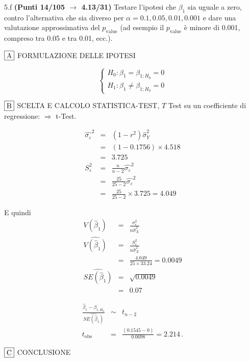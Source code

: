 \documentclass[
  11pt,
]{book}
\theoremstyle{mytheoremstyle}
\theoremstyle{mydefstyle}
\newenvironment{sol}
  {
  \begin{tcolorbox}[enhanced,breakable,arc=0.1mm,boxrule=1pt,colback=white,colframe=iblue,
  title=\bf \fontfamily{lmss}\selectfont \hspace{.5 cm} Soluzione,drop fuzzy shadow]

}{
\end{tcolorbox}
  }
\begin{document}
5.f \textbf{(Punti 14/105 \(\rightarrow\) 4.13/31)} Testare l'ipotesi che \(\beta_1\) sia uguale a zero, contro l'alternativa che sia diverso per \(\alpha=0.1,0.05,0.01,0.001\) e dare una valutazione approssimativa del \(p_\text{value}\) (ad esempio il \(p_\text{value}\) è minore di 0.001, compreso tra 0.05 e tra 0.01, ecc.).

\begin{sol}
\(\fbox{A}\) FORMULAZIONE DELLE IPOTESI

\[\begin{cases}
   H_0: \beta_1 = \beta_{1;H_0}=0 \\
   H_1: \beta_1 \neq \beta_{1;H_0}=0 
   \end{cases}\]

\(\fbox{B}\) SCELTA E CALCOLO STATISTICA-TEST, \(T\)
Test su un coefficiente di regressione: \(\Rightarrow\) t-Test.

\begin{eqnarray*}
\hat{\sigma_\varepsilon}^2&=&(1-r^2)\hat\sigma_Y^2\\
&=& (1- 0.1756 )\times 4.518 \\
   &=&  3.725 \\
   S_\varepsilon^2 &=& \frac{n} {n-2} \hat{\sigma_\varepsilon}^2\\
   &=&  \frac{ 25 } { 25 -2} \hat{\sigma_\varepsilon}^2 \\
 &=&  \frac{ 25 } { 25 -2} \times  3.725  =  4.049  
\end{eqnarray*}

E quindi\begin{eqnarray*}
V(\hat\beta_{1}) &=& \frac{\sigma_{\varepsilon}^{2}} {n \hat{\sigma}^{2}_{X}} \\
\widehat{V(\hat\beta_{1})} &=& \frac{S_{\varepsilon}^{2}} {n \hat{\sigma}^{2}_{X}} \\
 &=& \frac{ 4.049 } { 25 \times  33.24 } =  0.0049 \\
 \widehat{SE(\hat\beta_{1})}        &=&  \sqrt{ 0.0049 }\\
 &=&  0.07 
\end{eqnarray*}

\begin{eqnarray*}
 \frac{\hat\beta_{ 1 } - \beta_{ 1 ;H_0}} {\widehat{SE(\hat\beta_{ 1 })}}&\sim&t_{n-2}\\
   t_{\text{obs}}
&=& \frac{ ( 0.1545 -  0 )} { 0.0698 }
 =   2.214 \, .
\end{eqnarray*}

\(\fbox{C}\) CONCLUSIONE


\end{sol}
\end{document}
